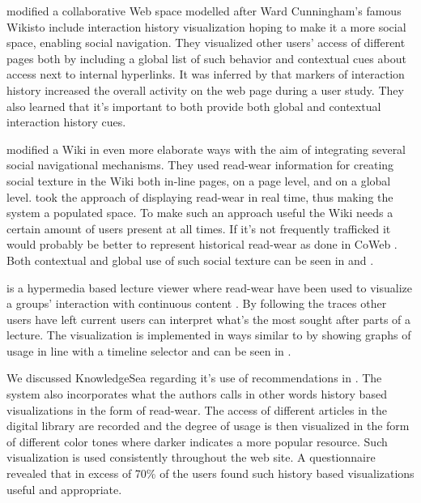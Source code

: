 \citet{dieberger00a} modified \dash{}a collaborative Web space
modelled after Ward Cunningham's famous Wikis\dash{}to include interaction
history visualization hoping to make it a more social space, enabling social
navigation. They visualized other users' access of different pages both by
including a global list of such behavior and contextual cues about access
next to internal hyperlinks.
It was inferred by \citeauthor{dieberger00a} that markers of interaction
history increased the overall activity on the web page during a user study.
They also learned that it's important to both provide both global and
contextual interaction history cues.

\citet{xu06} modified a Wiki in even more elaborate ways
with the aim of integrating several social navigational mechanisms.
They used read-wear information for creating social
texture in the Wiki both in-line pages, on a page level, and on a global
level. \citeauthor{xu06} took the approach of displaying read-wear in real
time, thus making the system a populated space. To make such an approach
useful the Wiki needs a certain amount of users present at all times. If
it's not frequently trafficked it would probably be better to represent
historical read-wear as done in CoWeb \citep[p.~220]{dieberger00a}. Both
contextual and global use of such social texture can be seen in
 and .

 is a hypermedia based lecture viewer where read-wear
have been used to visualize a groups' interaction with continuous content
\citep{mertens06}. By following the traces other users have left current users
can interpret what's the most sought after parts of a lecture. The
visualization is implemented in ways similar to \citet{hill92} by showing
graphs of usage in line with a timeline selector and can be seen in
.

We discussed KnowledgeSea regarding it's use of recommendations in
.
The system also incorporates what the authors calls
\citep[p.~12]{brusilovsky05}\dash{}in other words history based visualizations
in the form of read-wear. The access of different articles in the digital
library are recorded and the degree of usage is then visualized in the form of
different color tones where darker indicates a more popular resource. Such
visualization is used consistently throughout the web site. A questionnaire
revealed that in excess of 70\% \citeyearpar[p.15]{brusilovsky05} of the users
found such history based visualizations useful and appropriate.

